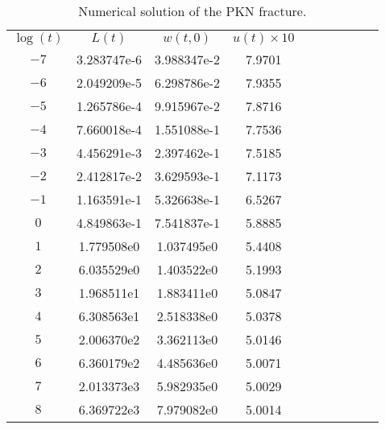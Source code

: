 \begin{table}[H]
\centering
\begin{tabular}{c|c|c|c|c|c|c|c|c|c|}
\cline{1-4}
\multicolumn{1}{|c|}{$\log(t)$}&$L(t)$&$w(t,0)$&$u(t) \times 10$
\\ \cline{1-4}
\multicolumn{1}{|c|}{$-7$}&3.283747e-6&3.988347e-2&7.9701
 \\ \cline{1-4}
\multicolumn{1}{|c|}{$-6$}&2.049209e-5&6.298786e-2&7.9355
 \\ \cline{1-4}
\multicolumn{1}{|c|}{$-5$}& 1.265786e-4&9.915967e-2&7.8716
 \\ \cline{1-4}
\multicolumn{1}{|c|}{$-4$}& 7.660018e-4&1.551088e-1&7.7536
 \\ \cline{1-4}
\multicolumn{1}{|c|}{$-3$}&4.456291e-3&2.397462e-1&7.5185
 \\ \cline{1-4}
\multicolumn{1}{|c|}{$-2$}&2.412817e-2&3.629593e-1&7.1173
 \\ \cline{1-4}
\multicolumn{1}{|c|}{$-1$}&1.163591e-1&5.326638e-1&6.5267
 \\ \cline{1-4}
\multicolumn{1}{|c|}{$0$}&4.849863e-1&7.541837e-1&5.8885
 \\ \cline{1-4}
 \multicolumn{1}{|c|}{$1$}&1.779508e0&1.037495e0&5.4408
 \\ \cline{1-4}
 \multicolumn{1}{|c|}{$2$}&6.035529e0&1.403522e0&5.1993
 \\ \cline{1-4}
  \multicolumn{1}{|c|}{$3$}&1.968511e1&1.883411e0&5.0847
 \\ \cline{1-4}
  \multicolumn{1}{|c|}{$4$}&6.308563e1&2.518338e0&5.0378
 \\ \cline{1-4}
  \multicolumn{1}{|c|}{$5$}& 2.006370e2&3.362113e0&5.0146
 \\ \cline{1-4}
  \multicolumn{1}{|c|}{$6$}&6.360179e2&4.485636e0&5.0071
 \\ \cline{1-4}
  \multicolumn{1}{|c|}{$7$}&2.013373e3&5.982935e0&5.0029
 \\ \cline{1-4}
  \multicolumn{1}{|c|}{$8$}&6.369722e3&7.979082e0&5.0014
 \\ \cline{1-4}
\end{tabular}
\caption{Numerical solution of the PKN fracture.}
\label{table_Carter}
\end{table}